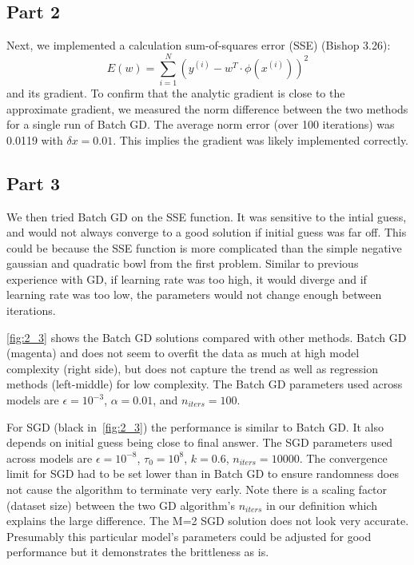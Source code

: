 \subsection{Part 2}
Next, we implemented a calculation sum-of-squares error (SSE) (Bishop 3.26):
\begin{equation}
E(w) = \sum_{i=1}^{N} (y^{(i)}-w^T\cdot \phi(x^{(i)}))^2
\label{eq:sse}
\end{equation}
and its gradient.
To confirm that the analytic gradient is close to the approximate gradient, we measured the norm difference between the two methods for a single run of Batch GD.
The average norm error (over 100 iterations) was 0.0119 with $\delta x = 0.01$.
This implies the gradient was likely implemented correctly.

\subsection{Part 3}
We then tried Batch GD on the SSE function.
It was sensitive to the intial guess, and would not always converge to a good solution if initial guess was far off.
This could be because the SSE function is more complicated than the simple negative gaussian and quadratic bowl from the first problem.
Similar to previous experience with GD, if learning rate was too high, it would diverge and if learning rate was too low, the parameters would not change enough between iterations.

\cref{fig:2_3} shows the Batch GD solutions compared with other methods.
Batch GD (magenta) and does not seem to overfit the data as much at high model complexity (right side), but does not capture the trend as well as regression methods (left-middle) for low complexity.
The Batch GD parameters used across models are $\epsilon=10^{-3}$, $\alpha=0.01$, and $n_{iters}=100$.

For SGD (black in~\cref{fig:2_3}) the performance is similar to Batch GD.
It also depends on initial guess being close to final answer.
The SGD parameters used across models are $\epsilon=10^{-8}$, $\tau_0=10^8$, $k=0.6$, $n_{iters}=10000$.
The convergence limit for SGD had to be set lower than in Batch GD to ensure randomness does not cause the algorithm to terminate very early.
Note there is a scaling factor (dataset size) between the two GD algorithm's $n_{iters}$ in our definition which explains the large difference.
The M=2 SGD solution does not look very accurate.
Presumably this particular model's parameters could be adjusted for good performance but it demonstrates the brittleness as is.

